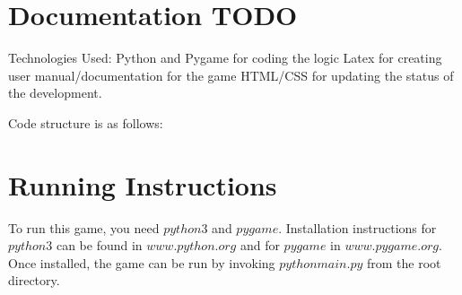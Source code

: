 \documentclass[a4paper,12pt]{report}
\begin{document}
\section{Documentation TODO}
Technologies Used: Python and Pygame for coding the logic
Latex for creating user manual/documentation for the game
HTML/CSS for updating the status of the development.

Code structure is as follows:

\section{Running Instructions}
To run this game, you need $python3$ and $pygame$. Installation instructions for $python3$ can be found in $www.python.org$ and for $pygame$ in $www.pygame.org$. Once installed, the game can be run by invoking $python main.py$ from the root directory.
\end{document}

